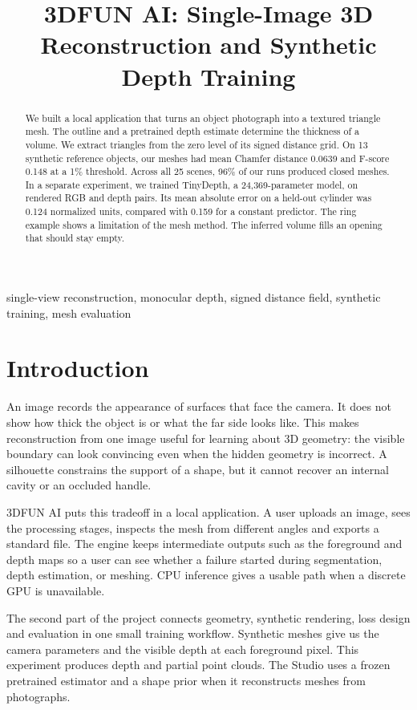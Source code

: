 \documentclass[conference]{IEEEtran}
\title{3DFUN AI: Single-Image 3D Reconstruction and Synthetic Depth Training}
\author{\IEEEauthorblockN{J Ganesh$^{1}$, M Jagadeshwar$^{2}$, B Varshith$^{3}$, Pranav Kashyap$^{4}$, C Sai Aravind$^{5}$}
\IEEEauthorblockA{Group 17, 3D Computer Vision, Indian Institute of Information Technology Dharwad\\
$^{1}$23BDS024, $^{2}$23BDS033, $^{3}$23BDS011, $^{4}$23BCS098, $^{5}$23BDS075\\
Correspondence: J Ganesh, \texttt{23bds024@iiitdwd.ac.in}}}
\begin{document}
\maketitle
\begin{abstract}
We built a local application that turns an object photograph into a textured triangle mesh. The outline and a pretrained depth estimate determine the thickness of a volume. We extract triangles from the zero level of its signed distance grid. On 13 synthetic reference objects, our meshes had mean Chamfer distance 0.0639 and F-score 0.148 at a 1\% threshold. Across all 25 scenes, 96\% of our runs produced closed meshes. In a separate experiment, we trained TinyDepth, a 24,369-parameter model, on rendered RGB and depth pairs. Its mean absolute error on a held-out cylinder was 0.124 normalized units, compared with 0.159 for a constant predictor. The ring example shows a limitation of the mesh method. The inferred volume fills an opening that should stay empty.
\end{abstract}
\begin{IEEEkeywords}
single-view reconstruction, monocular depth, signed distance field, synthetic training, mesh evaluation
\end{IEEEkeywords}

\section{Introduction}
An image records the appearance of surfaces that face the camera. It does not show how thick the object is or what the far side looks like. This makes reconstruction from one image useful for learning about 3D geometry: the visible boundary can look convincing even when the hidden geometry is incorrect. A silhouette constrains the support of a shape, but it cannot recover an internal cavity or an occluded handle.

3DFUN AI puts this tradeoff in a local application. A user uploads an image, sees the processing stages, inspects the mesh from different angles and exports a standard file. The engine keeps intermediate outputs such as the foreground and depth maps so a user can see whether a failure started during segmentation, depth estimation, or meshing. CPU inference gives a usable path when a discrete GPU is unavailable.

The second part of the project connects geometry, synthetic rendering, loss design and evaluation in one small training workflow. Synthetic meshes give us the camera parameters and the visible depth at each foreground pixel. This experiment produces depth and partial point clouds. The Studio uses a frozen pretrained estimator and a shape prior when it reconstructs meshes from photographs.
\end{document}
